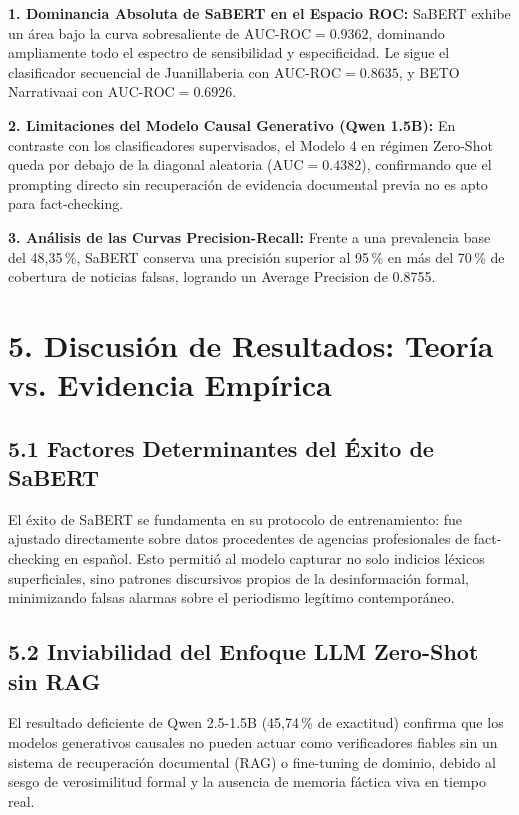 \textbf{1. Dominancia Absoluta de SaBERT en el Espacio ROC:}
SaBERT exhibe un área bajo la curva sobresaliente de $\text{AUC-ROC} = 0.9362$, dominando ampliamente todo el espectro de sensibilidad y especificidad. Le sigue el clasificador secuencial de Juanillaberia con $\text{AUC-ROC} = 0.8635$, y BETO Narrativaai con $\text{AUC-ROC} = 0.6926$.

\textbf{2. Limitaciones del Modelo Causal Generativo (Qwen 1.5B):}
En contraste con los clasificadores supervisados, el Modelo 4 en régimen Zero-Shot queda por debajo de la diagonal aleatoria ($\text{AUC} = 0.4382$), confirmando que el prompting directo sin recuperación de evidencia documental previa no es apto para fact-checking.

\textbf{3. Análisis de las Curvas Precision-Recall:}
Frente a una prevalencia base del 48,35\,\%, SaBERT conserva una precisión superior al 95\,\% en más del 70\,\% de cobertura de noticias falsas, logrando un Average Precision de 0.8755.


\section*{5. Discusión de Resultados: Teoría vs. Evidencia Empírica}

\subsection*{5.1 Factores Determinantes del Éxito de SaBERT}

El éxito de SaBERT se fundamenta en su protocolo de entrenamiento: fue ajustado directamente sobre datos procedentes de agencias profesionales de fact-checking en español. Esto permitió al modelo capturar no solo indicios léxicos superficiales, sino patrones discursivos propios de la desinformación formal, minimizando falsas alarmas sobre el periodismo legítimo contemporáneo.

\subsection*{5.2 Inviabilidad del Enfoque LLM Zero-Shot sin RAG}

El resultado deficiente de Qwen 2.5-1.5B (45,74\,\% de exactitud) confirma que los modelos generativos causales no pueden actuar como verificadores fiables sin un sistema de recuperación documental (RAG) o fine-tuning de dominio, debido al sesgo de verosimilitud formal y la ausencia de memoria fáctica viva en tiempo real.


